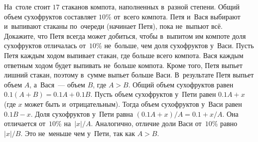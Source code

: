 \problem
На~столе стоит $17$ стаканов компота, наполненных в~разной степени.
Общий объем сухофруктов составляет $10\%$ от~всего компота.
Петя и~Вася выбирают и~выпивают стаканы по~очереди (начинает Петя), пока
не~выпьют всё.
Докажите, что Петя всегда может добиться, чтобы в~выпитом им компоте доля
сухофруктов отличалась от~$10\%$ не~больше, чем доля сухофруктов у~Васи.
\solution
Пусть Петя каждым ходом выпивает стакан, где больше всего компота.
Вася каждым ответным ходом будет выпивать не~больше компота.
Кроме того, Петя выпьет лишний стакан, поэтому в~сумме выпьет больше Васи.
В~результате Петя выпьет объем $A$, а~Вася~--- объем $B$, где $A>B$.
Общий объем сухофруктов равен $0.1 (A + B) = 0.1 A + 0.1 B$.
Пусть объем сухофруктов у~Пети равен $0.1 A + x$ (где $x$ может быть
и~отрицательным).
Тогда объем сухофруктов у~Васи равен $0.1 B - x$.
Доля сухофруктов у~Пети равна $(0.1 A + x) / A = 0.1 + x / A$.
Она отличается от~$10\%$ на~$|x| / A$.
Аналогично, отличие доли Васи от~$10\%$ равно $|x| / B$.
Это не~меньше чем у~Пети, так как $A > B$.
\endproblem

